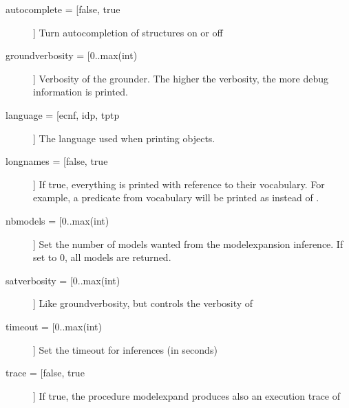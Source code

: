 \documentclass[a4]{article}
\begin{document}
\begin{description}
	\item[autocomplete = [false, true]] Turn autocompletion of structures on or off
	\item[groundverbosity = [0..max(int)]] Verbosity of the grounder.  The higher the verbosity, the more debug information is printed.
	\item[language = [ecnf, idp, %
				tptp]] The language used when printing objects. 
	\item[longnames = [false, true]] If true, everything is printed with reference to their vocabulary.  For example, a predicate  from vocabulary  will be printed as  instead of .
	\item[nbmodels = [0..max(int)]] Set the number of models wanted from the modelexpansion inference.  If set to 0, all models are returned.
	\item[satverbosity = [0..max(int)]] Like groundverbosity, but controls the verbosity of \minisatid
	\item[timeout = [0..max(int)]] Set the timeout for inferences (in seconds)
	\item[trace = [false, true]] If true, the procedure modelexpand produces also an execution trace of \minisatid 

\end{description}
\end{document}
